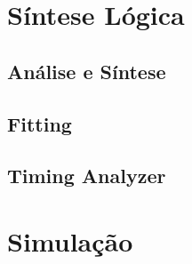 \section{Síntese Lógica}
{}

    \subsection{Análise e Síntese}
    {}

    \subsection{Fitting}
    {}

    \subsection{Timing Analyzer}
    {}

\section{Simulação}
{}

